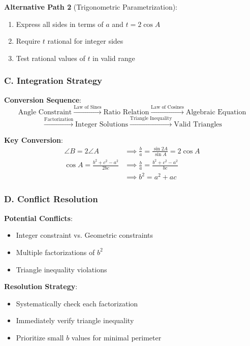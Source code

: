 \documentclass[12pt]{article}
\begin{document}
\begin{techniquesbox}
\textbf{Alternative Path 2} (Trigonometric Parametrization):
\begin{enumerate}
    \item Express all sides in terms of $a$ and $t = 2\cos A$
    \item Require $t$ rational for integer sides
    \item Test rational values of $t$ in valid range
\end{enumerate}

\subsubsection*{C. Integration Strategy}

\textbf{Conversion Sequence}:
$$\text{Angle Constraint} \xrightarrow{\text{Law of Sines}} \text{Ratio Relation} \xrightarrow{\text{Law of Cosines}} \text{Algebraic Equation}$$
$$\xrightarrow{\text{Factorization}} \text{Integer Solutions} \xrightarrow{\text{Triangle Inequality}} \text{Valid Triangles}$$

\textbf{Key Conversion}:
\begin{align*}
\angle B = 2\angle A &\implies \frac{b}{a} = \frac{\sin 2A}{\sin A} = 2\cos A \\
\cos A = \frac{b^2+c^2-a^2}{2bc} &\implies \frac{b}{a} = \frac{b^2+c^2-a^2}{bc} \\
&\implies b^2 = a^2 + ac
\end{align*}

\subsubsection*{D. Conflict Resolution}

\textbf{Potential Conflicts}:
\begin{itemize}
    \item Integer constraint vs. Geometric constraints
    \item Multiple factorizations of $b^2$
    \item Triangle inequality violations
\end{itemize}

\textbf{Resolution Strategy}:
\begin{itemize}
    \item Systematically check each factorization
    \item Immediately verify triangle inequality
    \item Prioritize small $b$ values for minimal perimeter
\end{itemize}

\end{techniquesbox}
\end{document}
